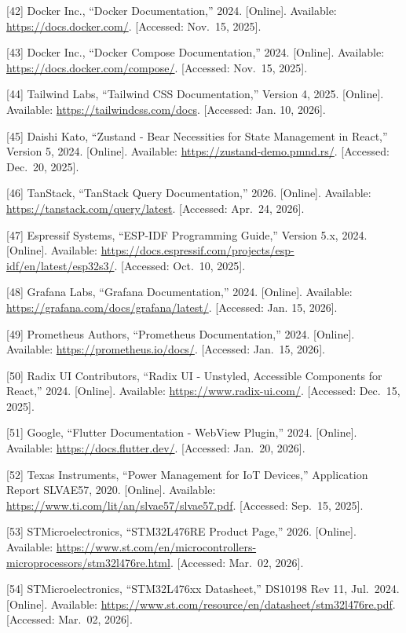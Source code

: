 \documentclass[a4paper]{extarticle}
\begin{document}
{[}42{]} Docker Inc., ``Docker Documentation,'' 2024. {[}Online{]}. Available:
\url{https://docs.docker.com/}. {[}Accessed: Nov.~15, 2025{]}.

{[}43{]} Docker Inc., ``Docker Compose Documentation,'' 2024. {[}Online{]}.
Available: \url{https://docs.docker.com/compose/}. {[}Accessed: Nov.~15,
2025{]}.

{[}44{]} Tailwind Labs, ``Tailwind CSS Documentation,'' Version 4, 2025.
{[}Online{]}. Available: \url{https://tailwindcss.com/docs}. {[}Accessed: Jan.
10, 2026{]}.

{[}45{]} Daishi Kato, ``Zustand - Bear Necessities for State Management in
React,'' Version 5, 2024. {[}Online{]}. Available:
\url{https://zustand-demo.pmnd.rs/}. {[}Accessed: Dec.~20, 2025{]}.

{[}46{]} TanStack, ``TanStack Query Documentation,'' 2026. {[}Online{]}.
Available:
\url{https://tanstack.com/query/latest}.
{[}Accessed: Apr.~24, 2026{]}.

{[}47{]} Espressif Systems, ``ESP-IDF Programming Guide,'' Version 5.x, 2024. {[}Online{]}. Available:
\url{https://docs.espressif.com/projects/esp-idf/en/latest/esp32s3/}.
{[}Accessed: Oct.~10, 2025{]}.

{[}48{]} Grafana Labs, ``Grafana Documentation,'' 2024. {[}Online{]}.
Available: \url{https://grafana.com/docs/grafana/latest/}. {[}Accessed: Jan.
15, 2026{]}.

{[}49{]} Prometheus Authors, ``Prometheus Documentation,'' 2024. {[}Online{]}.
Available: \url{https://prometheus.io/docs/}. {[}Accessed: Jan.~15, 2026{]}.

{[}50{]} Radix UI Contributors, ``Radix UI - Unstyled, Accessible
Components for React,'' 2024. {[}Online{]}. Available:
\url{https://www.radix-ui.com/}. {[}Accessed: Dec.~15, 2025{]}.

{[}51{]} Google, ``Flutter Documentation - WebView Plugin,'' 2024.
{[}Online{]}. Available: \url{https://docs.flutter.dev/}. {[}Accessed: Jan.~20,
2026{]}.

{[}52{]} Texas Instruments, ``Power Management for IoT Devices,''
Application Report SLVAE57, 2020. {[}Online{]}. Available:
\url{https://www.ti.com/lit/an/slvae57/slvae57.pdf}. {[}Accessed: Sep.~15,
2025{]}.

{[}53{]} STMicroelectronics, ``STM32L476RE Product Page,'' 2026. {[}Online{]}.
Available:
\url{https://www.st.com/en/microcontrollers-microprocessors/stm32l476re.html}.
{[}Accessed: Mar.~02, 2026{]}.

{[}54{]} STMicroelectronics, ``STM32L476xx Datasheet,'' DS10198 Rev 11, Jul.~2024. {[}Online{]}. Available:
\url{https://www.st.com/resource/en/datasheet/stm32l476re.pdf}. {[}Accessed:
Mar.~02, 2026{]}.
\end{document}
